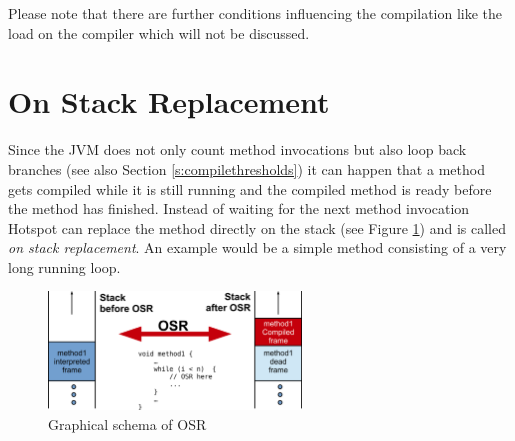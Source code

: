 Please note that there are further conditions influencing the compilation like the load on the compiler which will not be discussed.

\section{On Stack Replacement}
\label{s:onstackreplacement}
Since the JVM does not only count method invocations but also loop back branches (see also Section \ref{s:compilethresholds}) it can happen that a method gets compiled while it is still running and the compiled method is ready before the method has finished.
Instead of waiting for the next method invocation Hotspot can replace the method directly on the stack (see Figure \ref{f:osr}) and is called \textit{on stack replacement}.
An example would be a simple method consisting of a very long running loop.
\begin{figure}[ht]
  \begin{center}
    \centering
    \includegraphics[width=0.6\textwidth]{figures/osr.png}
    \caption{Graphical schema of OSR}
    \label{f:osr}
  \end{center}
\end{figure}
